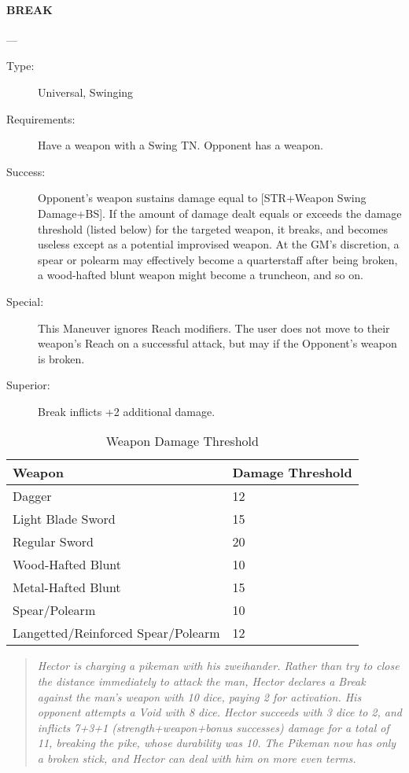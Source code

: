 \documentclass[oneside,11pt,english]{book}
\begin{document}
\paragraph{\large\label{man:BREAK}BREAK}---\quad{\large[X$ + $2]}
	\vspace{-10pt}
\begin{description}
	\item[Type:] Universal, Swinging
	\item[Requirements:] Have a weapon with a Swing TN. Opponent has a weapon.
	\item[Success:] Opponent’s weapon sustains damage equal to [STR+Weapon Swing Damage+BS]. If the amount of damage dealt equals or exceeds the damage threshold (listed below) for the targeted weapon, it breaks, and becomes useless except as a potential improvised weapon. At the GM’s discretion, a spear or polearm may effectively become a quarterstaff after being broken, a wood-hafted blunt weapon might become a truncheon, and so on. 
	\item[Special:] This Maneuver ignores Reach modifiers. The user does not move to their weapon’s Reach on a successful attack, but may if the Opponent’s weapon is broken. 
	\item[Superior:] Break inflicts +2 additional damage. 
\end{description}

\begin{table}[!ht]
	\centering
	\caption{Weapon Damage Threshold}
	\label{tab:Weapon Damage Threshold}
	\begin{tabu} spread 0pt {XX[-1,r]}
Weapon&Damage Threshold \\\toprule
Dagger&12\\
Light Blade Sword &15 \\
Regular Sword &20 \\
Wood-Hafted Blunt &10 \\
Metal-Hafted Blunt&15 \\
Spear/Polearm&10\\
Langetted/Reinforced Spear/Polearm&12 \\
	\end{tabu}
\end{table}

\begin{quotation}
\emph{Hector is charging a pikeman with his zweihander. Rather than try to close the distance immediately to attack the man, Hector declares a Break against the man’s weapon with 10 dice, paying 2 for activation. His opponent attempts a Void with 8 dice. Hector succeeds with 3 dice to 2, and inflicts 7+3+1 (strength+weapon+bonus successes) damage for a total of 11, breaking the pike, whose durability was 10. The Pikeman now has only a broken stick, and Hector can deal with him on more even terms.}
\end{quotation}
\end{document}
